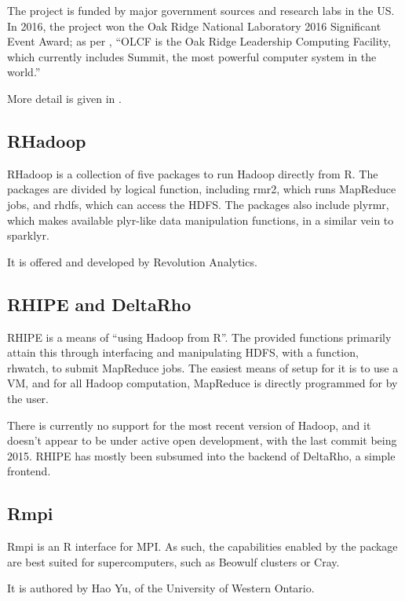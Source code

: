 \documentclass[10pt,a4paper]{article}
\begin{document}
The project is funded by major government sources and research labs in
the US. In 2016, the project won the Oak Ridge National Laboratory
2016 Significant Event Award; as per \textcite{pbdR2012},
\enquote{OLCF is the Oak Ridge Leadership Computing Facility, which
  currently includes Summit, the most powerful computer system in the
  world.}

More detail is given in \textcite{pbdBASEvignette}.


\subsection{RHadoop}
\label{sec:rhadoop}

RHadoop is a collection of five packages to run Hadoop directly from
R\textcite{analytics:_rhadoop_wiki}. The packages are divided by
logical function, including rmr2, which runs MapReduce jobs, and
rhdfs, which can access the HDFS. The packages also include plyrmr,
which makes available plyr-like data manipulation functions, in a
similar vein to sparklyr.

It is offered and developed by Revolution Analytics.
  
\subsection{RHIPE and DeltaRho}
\label{sec:rhipe-deltarho}

RHIPE is a means of ``using Hadoop from R''\cite{deltarho:_rhipe}. The
provided functions primarily attain this through interfacing and
manipulating HDFS, with a function, rhwatch, to submit MapReduce jobs.
The easiest means of setup for it is to use a VM, and for all Hadoop
computation, MapReduce is directly programmed for by the user.

There is currently no support for the most recent version of Hadoop,
and it doesn't appear to be under active open development, with the
last commit being 2015. RHIPE has mostly been subsumed into the
backend of DeltaRho, a simple frontend.
  
\subsection{Rmpi}
\label{sec:rmpi}

Rmpi is an R interface for MPI\cite{yu02:_rmpi}. As such, the
capabilities enabled by the package are best suited for
supercomputers, such as Beowulf clusters or Cray.

It is authored by Hao Yu, of the University of Western Ontario.
\end{document}
